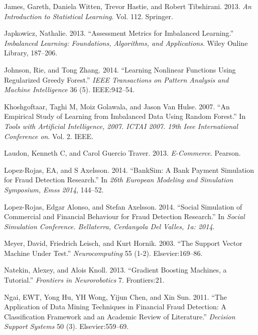 \documentclass[12pt,]{article}
\begin{document}
\leavevmode\hypertarget{ref-james2013introduction}{}%
James, Gareth, Daniela Witten, Trevor Hastie, and Robert Tibshirani.
2013. \emph{An Introduction to Statistical Learning}. Vol. 112.
Springer.

\leavevmode\hypertarget{ref-japkowicz2013assessment}{}%
Japkowicz, Nathalie. 2013. ``Assessment Metrics for Imbalanced
Learning.'' \emph{Imbalanced Learning: Foundations, Algorithms, and
Applications}. Wiley Online Library, 187--206.

\leavevmode\hypertarget{ref-johnson2014learning}{}%
Johnson, Rie, and Tong Zhang. 2014. ``Learning Nonlinear Functions Using
Regularized Greedy Forest.'' \emph{IEEE Transactions on Pattern Analysis
and Machine Intelligence} 36 (5). IEEE:942--54.

\leavevmode\hypertarget{ref-khoshgoftaar2007empirical}{}%
Khoshgoftaar, Taghi M, Moiz Golawala, and Jason Van Hulse. 2007. ``An
Empirical Study of Learning from Imbalanced Data Using Random Forest.''
In \emph{Tools with Artificial Intelligence, 2007. ICTAI 2007. 19th Ieee
International Conference on}. Vol. 2. IEEE.

\leavevmode\hypertarget{ref-laudon2013commerce}{}%
Laudon, Kenneth C, and Carol Guercio Traver. 2013. \emph{E-Commerce}.
Pearson.

\leavevmode\hypertarget{ref-lopez2014banksim}{}%
Lopez-Rojas, EA, and S Axelsson. 2014. ``BankSim: A Bank Payment
Simulation for Fraud Detection Research.'' In \emph{26th European
Modeling and Simulation Symposium, Emss 2014}, 144--52.

\leavevmode\hypertarget{ref-lopez2014social}{}%
Lopez-Rojas, Edgar Alonso, and Stefan Axelsson. 2014. ``Social
Simulation of Commercial and Financial Behaviour for Fraud Detection
Research.'' In \emph{Social Simulation Conference. Bellaterra,
Cerdanyola Del Valles, 1a: 2014}.

\leavevmode\hypertarget{ref-meyer2003support}{}%
Meyer, David, Friedrich Leisch, and Kurt Hornik. 2003. ``The Support
Vector Machine Under Test.'' \emph{Neurocomputing} 55 (1-2).
Elsevier:169--86.

\leavevmode\hypertarget{ref-natekin2013gradient}{}%
Natekin, Alexey, and Alois Knoll. 2013. ``Gradient Boosting Machines, a
Tutorial.'' \emph{Frontiers in Neurorobotics} 7. Frontiers:21.

\leavevmode\hypertarget{ref-ngai2011application}{}%
Ngai, EWT, Yong Hu, YH Wong, Yijun Chen, and Xin Sun. 2011. ``The
Application of Data Mining Techniques in Financial Fraud Detection: A
Classification Framework and an Academic Review of Literature.''
\emph{Decision Support Systems} 50 (3). Elsevier:559--69.
\end{document}
